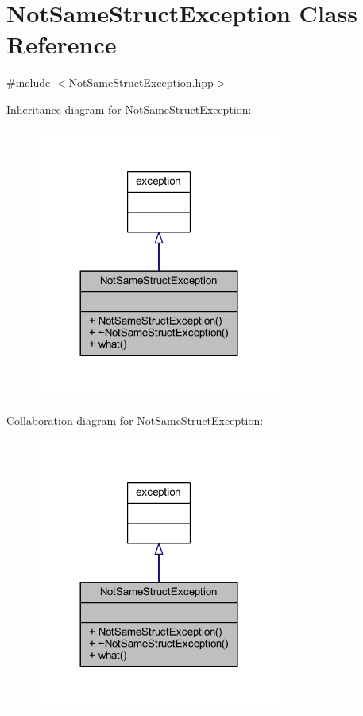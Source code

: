 \hypertarget{class_not_same_struct_exception}{}\section{Not\+Same\+Struct\+Exception Class Reference}
\label{class_not_same_struct_exception}


{\ttfamily \#include $<$Not\+Same\+Struct\+Exception.\+hpp$>$}



Inheritance diagram for Not\+Same\+Struct\+Exception\+:\nopagebreak
\begin{figure}[H]
\begin{center}
\leavevmode
\includegraphics[width=228pt]{class_not_same_struct_exception__inherit__graph}
\end{center}
\end{figure}


Collaboration diagram for Not\+Same\+Struct\+Exception\+:\nopagebreak
\begin{figure}[H]
\begin{center}
\leavevmode
\includegraphics[width=228pt]{class_not_same_struct_exception__coll__graph}
\end{center}
\end{figure}

